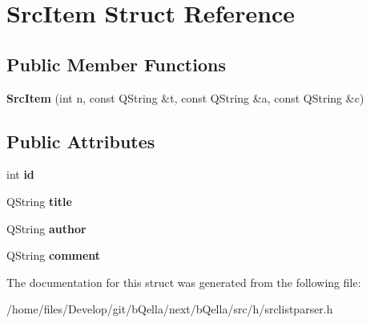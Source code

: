 \hypertarget{structSrcItem}{
\section{SrcItem Struct Reference}
\label{structSrcItem}
}
\subsection*{Public Member Functions}
\begin{DoxyCompactItemize}
\item 
\hypertarget{structSrcItem_a731cd72b01c9894b9be6c4bacf29cf01}{
{\bfseries SrcItem} (int n, const QString \&t, const QString \&a, const QString \&c)}
\label{structSrcItem_a731cd72b01c9894b9be6c4bacf29cf01}

\end{DoxyCompactItemize}
\subsection*{Public Attributes}
\begin{DoxyCompactItemize}
\item 
\hypertarget{structSrcItem_ab30dc992a98467979b0d6390f5548548}{
int {\bfseries id}}
\label{structSrcItem_ab30dc992a98467979b0d6390f5548548}

\item 
\hypertarget{structSrcItem_adfc60d092e4430ee2b0403ab7870294d}{
QString {\bfseries title}}
\label{structSrcItem_adfc60d092e4430ee2b0403ab7870294d}

\item 
\hypertarget{structSrcItem_aada28c9675208f548e15fc1c06aaabd0}{
QString {\bfseries author}}
\label{structSrcItem_aada28c9675208f548e15fc1c06aaabd0}

\item 
\hypertarget{structSrcItem_a879f83c664dfb95fa34705983a3109ca}{
QString {\bfseries comment}}
\label{structSrcItem_a879f83c664dfb95fa34705983a3109ca}

\end{DoxyCompactItemize}


The documentation for this struct was generated from the following file:\begin{DoxyCompactItemize}
\item 
/home/files/Develop/git/bQella/next/bQella/src/h/srclistparser.h\end{DoxyCompactItemize}
